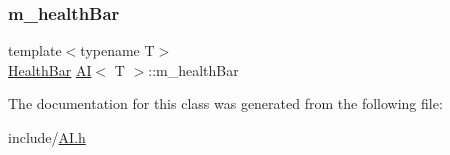 \mbox{\label{class_a_i_aa85c378f07b503e706be6cc150a2bae8}} 
\subsubsection{\texorpdfstring{m\+\_\+health\+Bar}{m\_healthBar}}
{\footnotesize\ttfamily template$<$typename T$>$ \\
\hyperlink{class_health_bar}{Health\+Bar} \hyperlink{class_a_i}{AI}$<$ T $>$\+::m\+\_\+health\+Bar\hspace{0.3cm}{\ttfamily [protected]}}



The documentation for this class was generated from the following file\+:\begin{DoxyCompactItemize}
\item 
include/\hyperlink{_a_i_8h}{A\+I.\+h}\end{DoxyCompactItemize}
